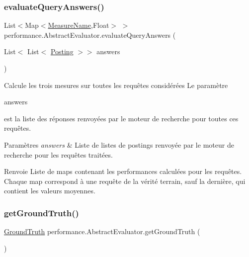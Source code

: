 \subsubsection{\texorpdfstring{evaluate\+Query\+Answers()}{evaluateQueryAnswers()}}
{\footnotesize\ttfamily List$<$Map$<$\hyperlink{enumperformance_1_1AbstractEvaluator_1_1MeasureName}{Measure\+Name},Float$>$ $>$ performance.\+Abstract\+Evaluator.\+evaluate\+Query\+Answers (\begin{DoxyParamCaption}\item[{List$<$ List$<$ \hyperlink{classindexation_1_1content_1_1Posting}{Posting} $>$$>$}]{answers }\end{DoxyParamCaption})\hspace{0.3cm}{\ttfamily [protected]}}

Calcule les trois mesures sur toutes les requêtes considérées Le paramètre
\begin{DoxyCode}
answers 
\end{DoxyCode}
 est la liste des réponses renvoyées par le moteur de recherche pour toutes ces requêtes.


\begin{DoxyParams}{Paramètres}
{\em answers} & Liste de listes de postings renvoyée par le moteur de recherche pour les requêtes traitées. \\
\hline
\end{DoxyParams}
\begin{DoxyReturn}{Renvoie}
Liste de maps contenant les performances calculées pour les requêtes. Chaque map correspond à une requête de la vérité terrain, sauf la dernière, qui contient les valeurs moyennes. 
\end{DoxyReturn}
\mbox{\label{classperformance_1_1AbstractEvaluator_a6812123cd08723f55af47ece00f5354d}} 
\subsubsection{\texorpdfstring{get\+Ground\+Truth()}{getGroundTruth()}}
{\footnotesize\ttfamily \hyperlink{classperformance_1_1GroundTruth}{Ground\+Truth} performance.\+Abstract\+Evaluator.\+get\+Ground\+Truth (\begin{DoxyParamCaption}{ }\end{DoxyParamCaption})}

